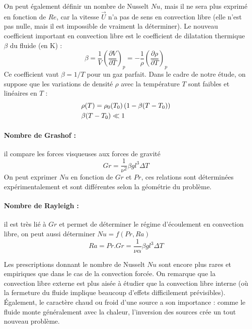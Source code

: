 On peut également définir un nombre de Nusselt $Nu$, mais il ne sera plus exprimé en fonction de $Re$, car la vitesse $\vec{U}$ n'a pas de sens en convection libre (elle n'est pas nulle, mais il est impossible de vraiment la déterminer). Le nouveau coefficient important en convection libre est le coefficient de dilatation thermique $\beta$ du fluide (en K) :
%
\begin{equation}
\beta = \frac{1}{V} \left( \frac{\partial V}{\partial T} \right)_p
      = - \frac{1}{\rho} \left( \frac{\partial \rho}{\partial T} \right)_p
\end{equation}
%
Ce coefficient vaut $\beta = 1/T$ pour un gaz parfait. Dans le cadre de notre étude, on suppose que les variations de densité $\rho$ avec la température $T$ sont faibles et linéaires en $T$ :
%
\begin{align}
 &\rho(T) = \rho_0(T_0) \left( 1 - \beta(T-T_0) \right) \\
 \notag &\beta (T-T_0) \ll 1
\end{align}

\paragraph{Nombre de Grashof :}il compare les forces visqueuses aux forces de gravité
%
\begin{equation}
Gr = \frac{1}{\nu^2}\beta g l^3 \Delta T
\end{equation}
%
On peut exprimer $Nu$ en fonction de $Gr$ et $Pr$, ces relations sont déterminées expérimentalement et sont différentes selon la géométrie du problème.

\paragraph{Nombre de Rayleigh :}il est très lié à $Gr$ et permet de déterminer le régime d'écoulement en convection libre, on peut aussi déterminer $Nu = f(Pr,Ra)$
%
\begin{equation}
Ra = Pr.Gr = \frac{1}{\nu\alpha}\beta g l^3 \Delta T
\end{equation}

Les prescriptions donnant le nombre de Nusselt $Nu$ sont encore plus rares et empiriques que dans le cas de la convection forcée. On remarque que la convection libre externe est plus aisée à étudier que la convection libre interne (où la fermeture du fluide implique beaucoup d'effets difficilement prévisibles). Également, le caractère chaud ou froid d'une source a son importance : comme le fluide monte généralement avec la chaleur, l'inversion des sources crée un tout nouveau problème.


